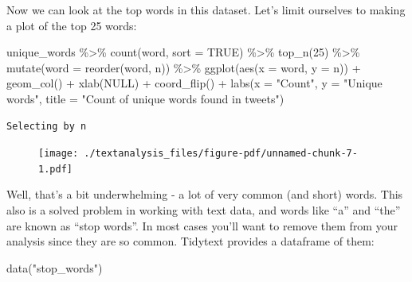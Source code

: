 \documentclass[
  letterpaper,
  DIV=11,
  numbers=noendperiod]{scrreprt}
\newenvironment{Shaded}{\begin{snugshade}}{\end{snugshade}}
\newcommand{\AttributeTok}[1]{\textcolor[rgb]{0.40,0.45,0.13}{#1}}
\newcommand{\ConstantTok}[1]{\textcolor[rgb]{0.56,0.35,0.01}{#1}}
\newcommand{\DecValTok}[1]{\textcolor[rgb]{0.68,0.00,0.00}{#1}}
\newcommand{\FunctionTok}[1]{\textcolor[rgb]{0.28,0.35,0.67}{#1}}
\newcommand{\NormalTok}[1]{\textcolor[rgb]{0.00,0.23,0.31}{#1}}
\newcommand{\SpecialCharTok}[1]{\textcolor[rgb]{0.37,0.37,0.37}{#1}}
\newcommand{\StringTok}[1]{\textcolor[rgb]{0.13,0.47,0.30}{#1}}
\begin{document}
Now we can look at the top words in this dataset. Let's limit ourselves
to making a plot of the top 25 words:

\begin{Shaded}
\begin{Highlighting}[]
\NormalTok{unique\_words }\SpecialCharTok{\%\textgreater{}\%}
  \FunctionTok{count}\NormalTok{(word, }\AttributeTok{sort =} \ConstantTok{TRUE}\NormalTok{) }\SpecialCharTok{\%\textgreater{}\%}
  \FunctionTok{top\_n}\NormalTok{(}\DecValTok{25}\NormalTok{) }\SpecialCharTok{\%\textgreater{}\%}
  \FunctionTok{mutate}\NormalTok{(}\AttributeTok{word =} \FunctionTok{reorder}\NormalTok{(word, n)) }\SpecialCharTok{\%\textgreater{}\%}
  \FunctionTok{ggplot}\NormalTok{(}\FunctionTok{aes}\NormalTok{(}\AttributeTok{x =}\NormalTok{ word, }\AttributeTok{y =}\NormalTok{ n)) }\SpecialCharTok{+}
  \FunctionTok{geom\_col}\NormalTok{() }\SpecialCharTok{+}
  \FunctionTok{xlab}\NormalTok{(}\ConstantTok{NULL}\NormalTok{) }\SpecialCharTok{+}
  \FunctionTok{coord\_flip}\NormalTok{() }\SpecialCharTok{+}
      \FunctionTok{labs}\NormalTok{(}\AttributeTok{x =} \StringTok{"Count"}\NormalTok{,}
      \AttributeTok{y =} \StringTok{"Unique words"}\NormalTok{,}
      \AttributeTok{title =} \StringTok{"Count of unique words found in tweets"}\NormalTok{)}
\end{Highlighting}
\end{Shaded}

\begin{verbatim}
Selecting by n
\end{verbatim}

\begin{figure}[H]

{\centering \texttt{[image: ./textanalysis\_files/figure-pdf/unnamed-chunk-7-1.pdf]}

}

\end{figure}

Well, that's a bit underwhelming - a lot of very common (and short)
words. This also is a solved problem in working with text data, and
words like ``a'' and ``the'' are known as ``stop words''. In most cases
you'll want to remove them from your analysis since they are so common.
Tidytext provides a dataframe of them:

\begin{Shaded}
\begin{Highlighting}[]
\FunctionTok{data}\NormalTok{(}\StringTok{"stop\_words"}\NormalTok{)}
\end{Highlighting}
\end{Shaded}
\end{document}
